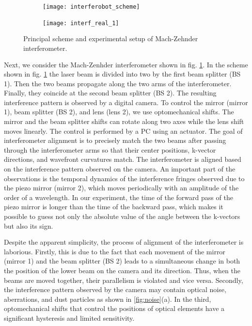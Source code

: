 \begin{figure}[ht]
    \centering
     \begin{subfigure}[b]{0.45\linewidth}
         \centering
         \texttt{[image: interferobot\_scheme]}
     \end{subfigure}
     \centering
     \begin{subfigure}[b]{0.45\linewidth}
         \centering
         \texttt{[image: interf\_real\_1]}
     \end{subfigure}
    \caption{
     Principal scheme and experimental setup of Mach-Zehnder interferometer.}
\label{fig:interf_scheme_1}
\end{figure}

Next, we consider the Mach-Zenhder interferometer shown in fig. \ref{fig:interf_scheme_1}. In the scheme shown in fig. \ref{fig:interf_scheme_1} the laser beam is divided into two by the first beam splitter (BS 1). Then the two beams propagate along the two arms of the interferometer. Finally, they coincide at the second beam splitter (BS 2). The resulting interference pattern is observed by a digital camera. To control the mirror (mirror 1), beam splitter (BS 2), and lens (lens 2), we use optomechanical shifts. The mirror and the beam splitter shifts can rotate along two axes while the lens shift moves linearly. The control is performed by a PC using an actuator. The goal of interferometer alignment is to precisely match the two beams after passing through the interferometer arms so that their center positions, k-vector directions, and wavefront curvatures match. The interferometer is aligned based on the interference pattern observed on the camera. An important part of the observations is the temporal dynamics of the interference fringes observed due to the piezo mirror (mirror 2), which moves periodically with an amplitude of the order of a wavelength. In our experiment, the time of the forward pass of the piezo mirror is longer than the time of the backward pass, which makes it possible to guess not only the absolute value of the angle between the k-vectors but also its sign.

Despite the apparent simplicity, the process of alignment of the interferometer is laborious. Firstly, this is due to the fact that each movement of the mirror (mirror 1) and the beam splitter (BS 2) leads to a simultaneous change in both the position of the lower beam on the camera and its direction. Thus, when the beams are moved together, their parallelism is violated and vice versa. Secondly, the interference pattern observed by the camera may contain optical noise, aberrations, and dust particles as shown in \ref{fig:noise}(a). In the third, optomechanical shifts that control the positions of optical elements have a significant hysteresis and limited sensitivity.

